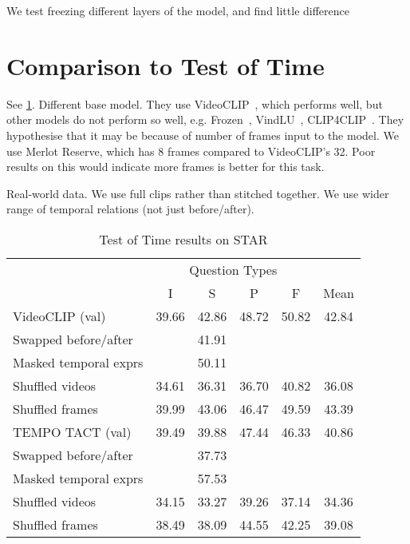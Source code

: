 We test freezing different layers of the model, and find little difference


\section{Comparison to Test of Time}
\label{sec:tactcompare}

See \cref{tab:tot_star}. Different base model. They use VideoCLIP~\citep{xu2021videoclip}, which performs well,
but other models do not perform so well, e.g. Frozen~\citep{bain2021frozen}, 
VindLU~\citep{cheng2023vindlu}, CLIP4CLIP~\citep{luo2022clip4clip}. They hypothesise
that it may be because of number of frames input to the model. We use Merlot Reserve,
which has 8 frames compared to VideoCLIP's 32. Poor results on this would indicate
more frames is better for this task.

Real-world data. We use full clips rather than stitched together. We use wider range
of temporal relations (not just before/after).

\begin{table}[tp] 
    \centering 
    \caption{Test of Time results on STAR}
    \label{tab:tot_star} 
    \begin{tabular}{lccccc} 
        \toprule
        \multicolumn{1}{c}{}    & \multicolumn{4}{c}{Question Types}            & \multicolumn{1}{c}{} \\
                                    \cmidrule(){2-5}
                                & I           & S        & P          & F           & Mean \\
        \cmidrule(r){1-1}           \cmidrule(){2-5}                                    \cmidrule(l){6-6}
        VideoCLIP (val)         & 39.66       & 42.86    & 48.72      & 50.82       & 42.84 \\
		Swapped before/after	&			  & 41.91	 &			  &				& \\
		Masked temporal exprs   &			  & 50.11    &			  &				& \\
		Shuffled videos			& 34.61		  & 36.31	 & 36.70	  & 40.82		& 36.08 \\
		Shuffled frames			& 39.99		  & 43.06	 & 46.47	  & 49.59		& 43.39 \\
		\midrule
		TEMPO TACT (val)		& 39.49		  & 39.88	 & 47.44	  & 46.33		& 40.86 \\
		Swapped before/after    &			  & 37.73    &			  &				& \\
		Masked temporal exprs   &			  & 57.53    &			  &				& \\
		Shuffled videos			& 34.15		  & 33.27	 & 39.26	  & 37.14		& 34.36 \\
		Shuffled frames			& 38.49		  & 38.09	 & 44.55	  & 42.25		& 39.08 \\
        \bottomrule
    \end{tabular} 
\end{table} 

